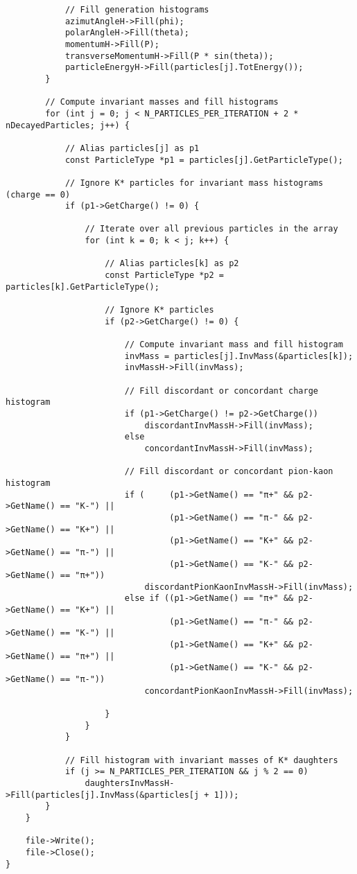 \documentclass{article}
\begin{document}
\begin{verbatim}
            // Fill generation histograms
            azimutAngleH->Fill(phi);
            polarAngleH->Fill(theta);
            momentumH->Fill(P);
            transverseMomentumH->Fill(P * sin(theta));
            particleEnergyH->Fill(particles[j].TotEnergy());
        }

        // Compute invariant masses and fill histograms
        for (int j = 0; j < N_PARTICLES_PER_ITERATION + 2 * nDecayedParticles; j++) {
            
            // Alias particles[j] as p1
            const ParticleType *p1 = particles[j].GetParticleType();

            // Ignore K* particles for invariant mass histograms (charge == 0)
            if (p1->GetCharge() != 0) {
                
                // Iterate over all previous particles in the array
                for (int k = 0; k < j; k++) {
                    
                    // Alias particles[k] as p2
                    const ParticleType *p2 = particles[k].GetParticleType();
                    
                    // Ignore K* particles
                    if (p2->GetCharge() != 0) {

                        // Compute invariant mass and fill histogram
                        invMass = particles[j].InvMass(&particles[k]);
                        invMassH->Fill(invMass);
                        
                        // Fill discordant or concordant charge histogram
                        if (p1->GetCharge() != p2->GetCharge())
                            discordantInvMassH->Fill(invMass);
                        else
                            concordantInvMassH->Fill(invMass);

                        // Fill discordant or concordant pion-kaon histogram
                        if (     (p1->GetName() == "π+" && p2->GetName() == "K-") ||
                                 (p1->GetName() == "π-" && p2->GetName() == "K+") ||
                                 (p1->GetName() == "K+" && p2->GetName() == "π-") ||
                                 (p1->GetName() == "K-" && p2->GetName() == "π+"))
                            discordantPionKaonInvMassH->Fill(invMass);
                        else if ((p1->GetName() == "π+" && p2->GetName() == "K+") ||
                                 (p1->GetName() == "π-" && p2->GetName() == "K-") ||
                                 (p1->GetName() == "K+" && p2->GetName() == "π+") ||
                                 (p1->GetName() == "K-" && p2->GetName() == "π-"))
                            concordantPionKaonInvMassH->Fill(invMass);

                    }
                }
            }

            // Fill histogram with invariant masses of K* daughters
            if (j >= N_PARTICLES_PER_ITERATION && j % 2 == 0)
                daughtersInvMassH->Fill(particles[j].InvMass(&particles[j + 1]));
        }
    }

    file->Write();
    file->Close();
}
\end{verbatim}
\end{document}
